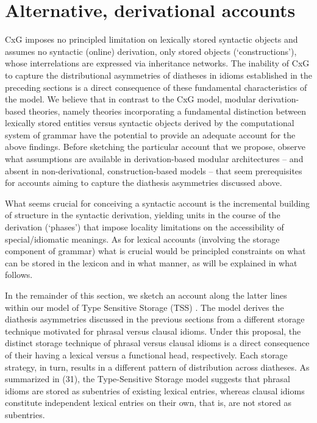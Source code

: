 \documentclass[output=paper,
modfonts
]{LSP/langsci}
\begin{document}
\section{Alternative, derivational accounts}

CxG imposes no principled limitation on lexically stored syntactic
objects and assumes no syntactic (online) derivation, only stored
objects (`constructions'), whose interrelations are expressed via
inheritance networks. The inability of CxG to capture the distributional
asymmetries of diatheses in idioms established in the preceding sections
is a direct consequence of these fundamental characteristics of the
model. We believe that in contrast to the CxG model, modular
derivation-based theories, namely theories incorporating a fundamental
distinction between lexically stored entities versus syntactic objects
derived by the computational system of grammar have the potential to
provide an adequate account for the above findings. Before sketching the
particular account that we propose, observe what assumptions are
available in derivation-based modular architectures -- and absent in
non-derivational, construction-based models -- that seem prerequisites
for accounts aiming to capture the diathesis asymmetries discussed
above.

What seems crucial for conceiving a syntactic account is the incremental
building of structure in the syntactic derivation, yielding units in the
course of the derivation (`phases') that impose locality limitations on
the accessibility of special/idiomatic meanings. As for lexical accounts
(involving the storage component of grammar) what is crucial would be
principled constraints on what can be stored in the lexicon and in what
manner, as will be explained in what follows.

In the remainder of this section, we sketch an account along the latter
lines within our model of Type Sensitive Storage (TSS) \citep{horvath2016}. The model derives the diathesis asymmetries discussed in
the previous sections from a different storage technique motivated for
phrasal versus clausal idioms. Under this proposal, the distinct storage
technique of phrasal versus clausal idioms is a direct consequence of
their having a lexical versus a functional head, respectively. Each
storage strategy, in turn, results in a different pattern of
distribution across diatheses. As summarized in (31), the Type-Sensitive
Storage model suggests that phrasal idioms are stored as subentries of
existing lexical entries, whereas clausal idioms constitute independent
lexical entries on their own, that is, are not stored as subentries.
\end{document}
